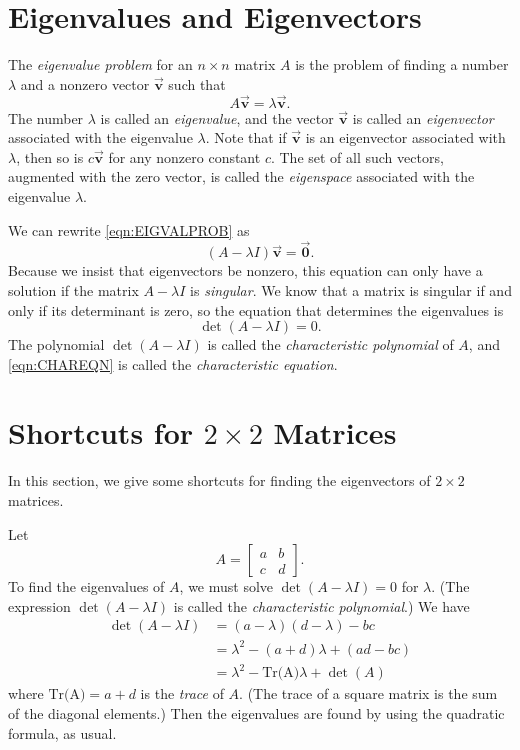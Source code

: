 \documentclass[reqno]{immbook}
\newcommand{\BV}{\vec{\textbf{v}}}
\newcommand{\BZ}{\vec{\textbf{0}}}  %
\begin{document}
\section{Eigenvalues and Eigenvectors}
%
The \emph{eigenvalue problem}
for an $n \times n$ matrix $A$
is the problem of finding a number $\lambda$ and a nonzero vector $\BV$
such that
\begin{equation}
    A\BV = \lambda \BV.
    \label{eqn:EIGVALPROB}
\end{equation}
The number $\lambda$ is called an \emph{eigenvalue}, 
and the vector $\BV$ is called an \emph{eigenvector}
associated with the eigenvalue $\lambda$.
Note that if $\BV$ is an eigenvector associated with
$\lambda$, then so is $c\BV$ for any nonzero constant
$c$.
The set of all such vectors, augmented with the zero
vector, is called the \emph{eigenspace}
associated with the eigenvalue $\lambda$.

We can rewrite \eqref{eqn:EIGVALPROB} as
\begin{equation}
   \left(A - \lambda I\right) \BV = \BZ.
\end{equation}
Because we insist that eigenvectors be nonzero,
this equation can only have a solution if
the matrix $A-\lambda I$ is \emph{singular}.
We know that a matrix is singular if and only if
its determinant is zero, so the equation that determines
the eigenvalues is
\begin{equation}
   \det\left(A-\lambda I\right) = 0.
   \label{eqn:CHAREQN}
\end{equation}
The polynomial $\det\left(A-\lambda I\right)$ is called
the \emph{characteristic polynomial}
of $A$, and
\eqref{eqn:CHAREQN} is 
called the \emph{characteristic equation}.
\section{Shortcuts for $2\times 2$ Matrices}
In this section, we give
some shortcuts for finding the eigenvectors of $2\times 2$ matrices.

Let
\[
   A = \begin{bmatrix}
              a & b \\ c & d
       \end{bmatrix}.
\]
To find the eigenvalues of $A$, we must solve
$\det(A-\lambda I)=0$ for $\lambda$.
(The expression $\det(A-\lambda I)$ is called
the \emph{characteristic polynomial}.)  We have
\[
\begin{split}
   \det(A-\lambda I) & = (a-\lambda)(d-\lambda)-bc \\
                     & = \lambda^2-(a+d)\lambda + (ad-bc) \\
		     & = \lambda^2 - \textrm{Tr(A)}\lambda + \det(A)
\end{split}
\]
where $\textrm{Tr(A)} = a+d$ is the \emph{trace} of $A$.
(The trace of a square matrix is the sum of the diagonal elements.)
Then the eigenvalues are found by using the quadratic
formula, as usual.
\end{document}
